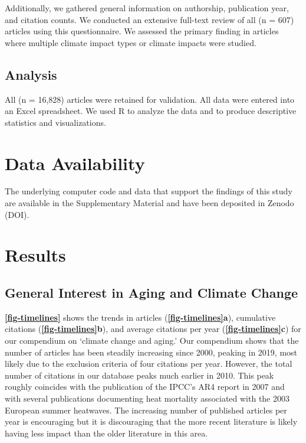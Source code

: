 \documentclass[12pt]{article}
\begin{document}
Additionally, we gathered general information on authorship, publication
year, and citation counts. We conducted an extensive full-text review of
all (n = 607) articles using this questionnaire. We assessed the primary
finding in articles where multiple climate impact types or climate
impacts were studied.

\hypertarget{analysis}{%
\subsection{Analysis}\label{analysis}}

All (n = 16,828) articles were retained for validation. All data were
entered into an Excel spreadsheet. We used R to analyze the data and to
produce descriptive statistics and visualizations.

\hypertarget{data-availability}{%
\section{Data Availability}\label{data-availability}}

The underlying computer code and data that support the findings of this
study are available in the Supplementary Material and have been
deposited in Zenodo (DOI).

\hypertarget{results}{%
\section{Results}\label{results}}

\hypertarget{general-interest-in-aging-and-climate-change}{%
\subsection{General Interest in Aging and Climate
Change}\label{general-interest-in-aging-and-climate-change}}

\textbf{\autoref{fig-timelines}} shows the trends in articles
(\textbf{\autoref{fig-timelines}a}), cumulative citations
(\textbf{\autoref{fig-timelines}b}), and average citations per year
(\textbf{\autoref{fig-timelines}c}) for our compendium on `climate
change and aging.' Our compendium shows that the number of articles has
been steadily increasing since 2000, peaking in 2019, most likely due to
the exclusion criteria of four citations per year. However, the total
number of citations in our database peaks much earlier in 2010. This
peak roughly coincides with the publication of the IPCC's AR4 report in
2007 and with several publications documenting heat mortality associated
with the 2003 European summer heatwaves. The increasing number of
published articles per year is encouraging but it is discouraging that
the more recent literature is likely having less impact than the older
literature in this area.
\end{document}
